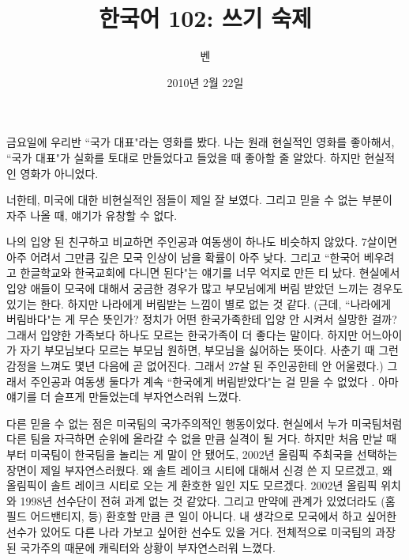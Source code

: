 \documentclass[12pt]{article}
\title{한국어 102: 쓰기 숙제}
\author{벤}
\date{2010년 2월 22일}
\begin{document}
\maketitle
\thispagestyle{empty}
\pagestyle{empty}
\doublespacing

금요일에 우리반 ``국가 대표"라는 영화를 봤다.  나는 원래 현실적인 영화를 좋아해서, ``국가 대표"가 실화를 토대로 만들었다고 들었을 때 좋아할 줄 알았다. 하지만 현실적인 영화가 아니었다.

너한테, 미국에 대한 비현실적인 점들이 제일 잘 보였다. 그리고 믿을 수 없는 부분이 자주 나올 때, 얘기가 유창할 수 없다.

나의 입양 된 친구하고 비교하면 주인공과 여동생이  하나도 비슷하지 않았다.  7살이면 아주 어려서 그만큼 깊은 모국 인상이 남을 확률이 아주 낮다. 그리고 ``한국어 베우려고 한글학교와 한국교회에 다니면 된다"는 얘기를 너무 억지로 만든 티 났다.  현실에서 입양 애들이 모국에 대해서 궁금한 경우가 많고 부모님에게 버림 받았던 느끼는 경우도 있기는 한다. 하지만 나라에게 버림받는 느낌이 별로 없는 것 같다. (근데, ``나라에게 버림바다"는 게 무슨 뜻인가? 정치가 어떤 한국가족한테 입양 안 시켜서 실망한 걸까? 그래서 입양한 가족보다 하나도 모르는 한국가족이 더 좋다는 말이다. 하지만 어느아이가 자기 부모님보다 모르는 부모님 원하면, 부모님을 싫어하는 뜻이다.  사춘기 때 그런 감정을 느껴도 몇년 다음에 곧 없어진다.  그래서 27살 된 주인공한테 안 어울렸다.) 그래서 주인공과 여동생 둘다가 계속 ``한국에게 버림받았다"는 걸 믿을 수 없었다 . 아마 얘기를 더 슬프게 만들었는데 부자연스러워 느꼈다.

다른 믿을 수 없는 점은 미국팀의 국가주의적인 행동이었다.  현실에서 누가 미국팀처럼 다른 팀을 자극하면 순위에 올라갈 수 없을 만큼 실격이 될 거다.  하지만 처음 만날 때부터 미국팀이 한국팀을 놀리는 게 말이 안 됐어도, 2002년 올림픽 주최국을 선택하는 장면이 제일 부자연스러웠다. 왜 솔트 레이크 시티에 대해서 신경 쓴 지 모르겠고, 왜 올림픽이 솔트 레이크 시티로 오는 게 환호한 일인 지도 모르겠다. 2002년 올림픽 위치와 1998년 선수단이 전혀 과계 없는 것 같았다. 그리고 만약에 관계가 있었더라도 (홈 필드 어드밴티지, 등) 환호할 만큼 큰 일이 아니다. 내 생각으로 모국에서 하고 싶어한 선수가 있어도 다른 나라 가보고 싶어한 선수도 있을 거다.  전체적으로 미국팀의 과장된 국가주의 때문에 캐릭터와 상황이 부자연스러워 느꼈다.
\end{document}
